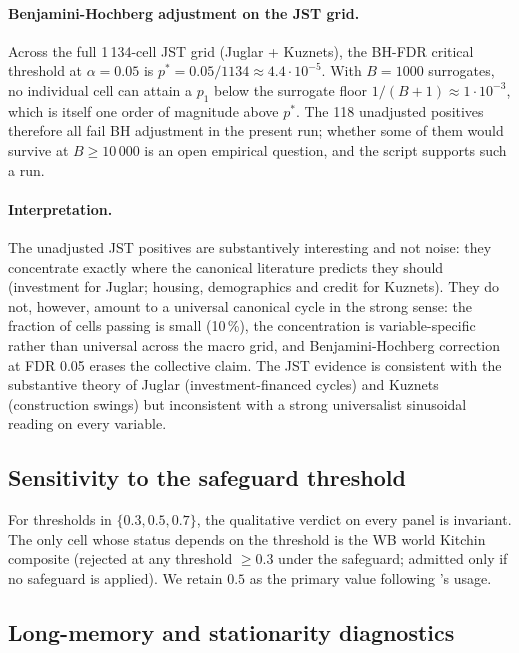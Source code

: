 \paragraph{Benjamini-Hochberg adjustment on the JST grid.}
Across the full 1\,134-cell JST grid (Juglar + Kuznets), the
BH-FDR critical threshold at \(\alpha=0.05\) is
\(p^* = 0.05 / 1134 \approx 4.4 \cdot 10^{-5}\). With \(B=1000\)
surrogates, no individual cell can attain a \(p_1\) below the
surrogate floor \(1/(B+1) \approx 1 \cdot 10^{-3}\), which is
itself one order of magnitude above \(p^*\). The 118
unadjusted positives therefore all fail BH adjustment in the
present run; whether some of them would survive at
\(B \geq 10\,000\) is an open empirical question, and the
 script supports such a run.

\paragraph{Interpretation.}
The unadjusted JST positives are substantively interesting and
not noise: they concentrate exactly where the canonical
literature predicts they should (investment for Juglar; housing,
demographics and credit for Kuznets). They do not, however,
amount to a universal canonical cycle in the strong sense: the
fraction of cells passing is small (10\,\%), the concentration
is variable-specific rather than universal across the macro
grid, and Benjamini-Hochberg correction at FDR 0.05 erases the
collective claim. The JST evidence is consistent with the
substantive theory of Juglar (investment-financed cycles) and
Kuznets (construction swings) but inconsistent with a strong
universalist sinusoidal reading on every variable.

\subsection{Sensitivity to the safeguard threshold}

For thresholds in \(\{0.3, 0.5, 0.7\}\), the qualitative
verdict on every panel is invariant. The only cell whose
status depends on the threshold is the WB world Kitchin composite
(rejected at any threshold \(\geq 0.3\) under the safeguard;
admitted only if no safeguard is applied). We retain
\(0.5\) as the primary value following \citet{wen2005}'s usage.

\subsection{Long-memory and stationarity diagnostics}
\label{sec:appendix_long_memory}

